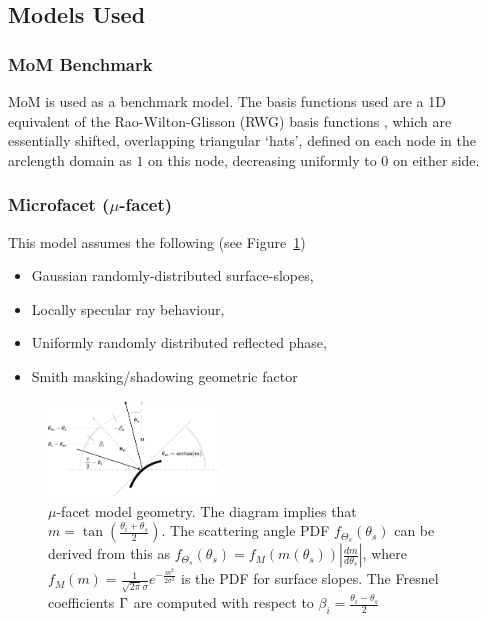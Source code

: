 \documentclass[lettersize,journal]{IEEEtran}
\begin{document}
\subsection{Models Used}
\subsubsection{MoM Benchmark}
MoM is used as a benchmark model. The basis functions used are a 1D equivalent of the
Rao-Wilton-Glisson (RWG) basis functions \cite{ref:RWGBasis}, which are essentially
shifted, overlapping triangular `hats', defined on each node in the arclength domain
as $1$ on this node, decreasing uniformly to 0 on either side.

\subsubsection{Microfacet ($\mu$-facet)}
This model assumes the following (see Figure~\ref{fig:microfacet})
\begin{itemize}
   \item Gaussian randomly-distributed surface-slopes,
   \item Locally specular ray behaviour,
   \item Uniformly randomly distributed reflected phase,
   \item Smith masking/shadowing geometric factor \cite{ref:geometricMasking}
\end{itemize} 

\begin{figure}
   \begin{center}
      \includegraphics[width=0.40\textwidth]{../figures/microfacet-crop.pdf}
   \end{center}
   \caption{$\mu$-facet model geometry. The diagram implies that $m = \tan \left(
   \frac{\theta_i + \theta_s}{2} \right)$. The scattering angle PDF
   $f_{\Theta_s}(\theta_s)$ can be derived from this as $f_{\Theta_s}(\theta_s) = f_M
   (m(\theta_s)) \left\lvert \frac{dm}{d \theta_s} \right \rvert$, where $f_M(m) =
   \frac{1}{\sqrt{2 \pi} \sigma} e^{- \frac{m^2}{2 \sigma^2}} $ is the PDF for
   surface slopes. The Fresnel coefficients $\Gamma$ are computed with respect to
   $\beta_i = \frac{\theta_i - \theta_s}{2}$}\label{fig:microfacet}
\end{figure}
\end{document}
